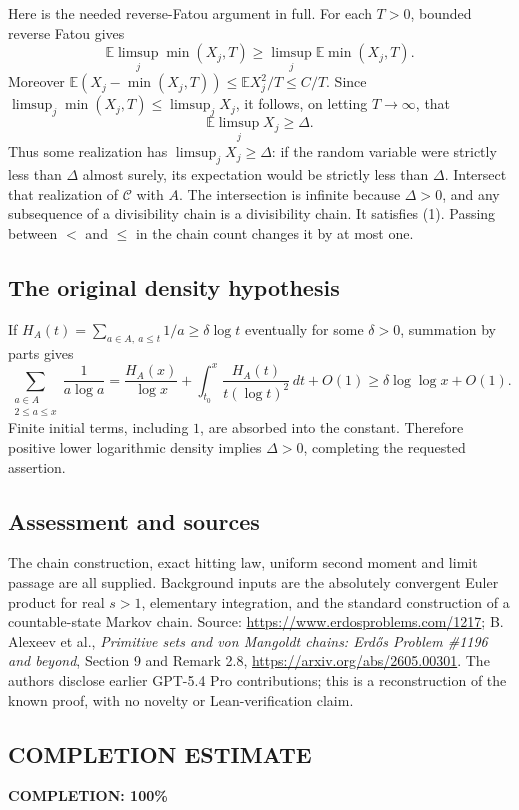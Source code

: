 Here is the needed reverse-Fatou argument in full. For each $T>0$, bounded reverse Fatou gives
\[
 \mathbb E\limsup_j\min(X_j,T)\ge\limsup_j\mathbb E\min(X_j,T).
\]
Moreover
$\mathbb E(X_j-\min(X_j,T))\le\mathbb E X_j^2/T\le C/T$.
Since $\limsup_j\min(X_j,T)\le\limsup_jX_j$, it follows, on letting $T\to\infty$, that
\[
 \mathbb E\limsup_jX_j\ge\Delta.
\]
Thus some realization has $\limsup_jX_j\ge\Delta$: if the random variable were strictly less than $\Delta$ almost surely, its expectation would be strictly less than $\Delta$. Intersect that realization of $\mathcal C$ with $A$. The intersection is infinite because $\Delta>0$, and any subsequence of a divisibility chain is a divisibility chain. It satisfies (1). Passing between $<$ and $\le$ in the chain count changes it by at most one.

\subsection*{The original density hypothesis}
If $H_A(t)=\sum_{a\in A,\ a\le t}1/a\ge\delta\log t$ eventually for some $\delta>0$, summation by parts gives
\[
 \sum_{\substack{a\in A\\2\le a\le x}}\frac1{a\log a}
 =\frac{H_A(x)}{\log x}
   +\int_{t_0}^{x}\frac{H_A(t)}{t(\log t)^2}\,dt+O(1)
 \ge\delta\log\log x+O(1).
\]
Finite initial terms, including $1$, are absorbed into the constant. Therefore positive lower logarithmic density implies $\Delta>0$, completing the requested assertion.

\subsection*{Assessment and sources}
The chain construction, exact hitting law, uniform second moment and limit passage are all supplied. Background inputs are the absolutely convergent Euler product for real $s>1$, elementary integration, and the standard construction of a countable-state Markov chain. Source: \url{https://www.erdosproblems.com/1217}; B. Alexeev et al., \emph{Primitive sets and von Mangoldt chains: Erd\H{o}s Problem \#1196 and beyond}, Section 9 and Remark 2.8, \url{https://arxiv.org/abs/2605.00301}. The authors disclose earlier GPT-5.4 Pro contributions; this is a reconstruction of the known proof, with no novelty or Lean-verification claim.
\subsection*{COMPLETION ESTIMATE}
\textbf{COMPLETION: 100\%}
